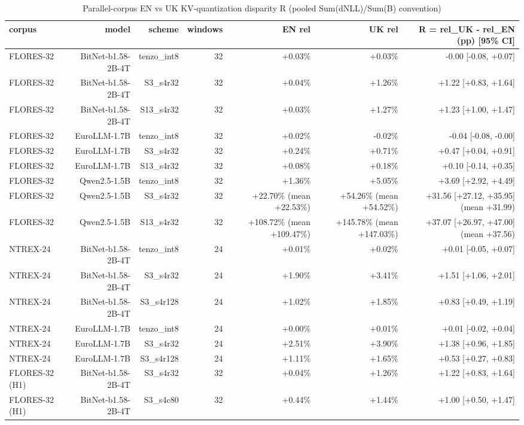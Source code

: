 \begin{table}[t]\centering\small
\caption{Parallel-corpus EN vs UK KV-quantization disparity R (pooled Sum(dNLL)/Sum(B) convention)}
\begin{tabular}{lrrrrrr}\toprule
corpus & model & scheme & windows & EN rel & UK rel & R = rel\_UK - rel\_EN (pp) [95\% CI] \\ \midrule
FLORES-32 & BitNet-b1.58-2B-4T & tenzo\_int8 & 32 & +0.03\% & +0.03\% & -0.00 [-0.08, +0.07] \\
FLORES-32 & BitNet-b1.58-2B-4T & S3\_s4r32 & 32 & +0.04\% & +1.26\% & +1.22 [+0.83, +1.64] \\
FLORES-32 & BitNet-b1.58-2B-4T & S13\_s4r32 & 32 & +0.03\% & +1.27\% & +1.23 [+1.00, +1.47] \\
FLORES-32 & EuroLLM-1.7B & tenzo\_int8 & 32 & +0.02\% & -0.02\% & -0.04 [-0.08, -0.00] \\
FLORES-32 & EuroLLM-1.7B & S3\_s4r32 & 32 & +0.24\% & +0.71\% & +0.47 [+0.04, +0.91] \\
FLORES-32 & EuroLLM-1.7B & S13\_s4r32 & 32 & +0.08\% & +0.18\% & +0.10 [-0.14, +0.35] \\
FLORES-32 & Qwen2.5-1.5B & tenzo\_int8 & 32 & +1.36\% & +5.05\% & +3.69 [+2.92, +4.49] \\
FLORES-32 & Qwen2.5-1.5B & S3\_s4r32 & 32 & +22.70\% (mean +22.53\%) & +54.26\% (mean +54.52\%) & +31.56 [+27.12, +35.95] (mean +31.99) \\
FLORES-32 & Qwen2.5-1.5B & S13\_s4r32 & 32 & +108.72\% (mean +109.47\%) & +145.78\% (mean +147.03\%) & +37.07 [+26.97, +47.00] (mean +37.56) \\
NTREX-24 & BitNet-b1.58-2B-4T & tenzo\_int8 & 24 & +0.01\% & +0.02\% & +0.01 [-0.05, +0.07] \\
NTREX-24 & BitNet-b1.58-2B-4T & S3\_s4r32 & 24 & +1.90\% & +3.41\% & +1.51 [+1.06, +2.01] \\
NTREX-24 & BitNet-b1.58-2B-4T & S3\_s4r128 & 24 & +1.02\% & +1.85\% & +0.83 [+0.49, +1.19] \\
NTREX-24 & EuroLLM-1.7B & tenzo\_int8 & 24 & +0.00\% & +0.01\% & +0.01 [-0.02, +0.04] \\
NTREX-24 & EuroLLM-1.7B & S3\_s4r32 & 24 & +2.51\% & +3.90\% & +1.38 [+0.96, +1.85] \\
NTREX-24 & EuroLLM-1.7B & S3\_s4r128 & 24 & +1.11\% & +1.65\% & +0.53 [+0.27, +0.83] \\
FLORES-32 (H1) & BitNet-b1.58-2B-4T & S3\_s4r32 & 32 & +0.04\% & +1.26\% & +1.22 [+0.83, +1.64] \\
FLORES-32 (H1) & BitNet-b1.58-2B-4T & S3\_s4c80 & 32 & +0.44\% & +1.44\% & +1.00 [+0.50, +1.47] \\

\end{tabular}
\end{table}
